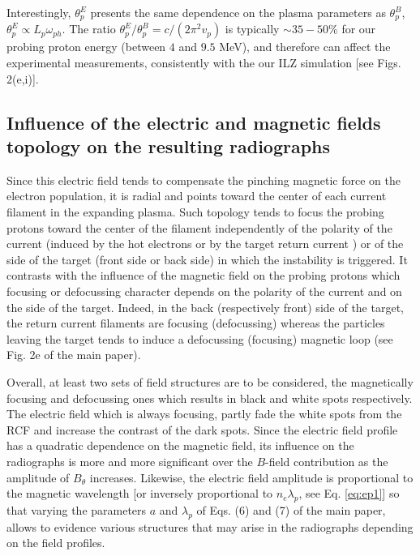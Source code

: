 \documentclass[aps,showpacs,superscriptaddress]{revtex4}
\begin{document}
Interestingly,  $\theta^E_p$ presents the same dependence on the plasma parameters as  $\theta^B_p$,  $\theta^E_p\propto L_p \omega_{ph}$.  The ratio $\theta^E_p/\theta^B_p =c/(2\pi^2v_p)$  is typically $\sim 35-50$\% for our  probing proton energy (between $4$ and $9.5$ MeV), and therefore can affect  the experimental measurements, consistently with the our ILZ simulation [see Figs. 2(e,i)].

\subsection{Influence of the electric and magnetic fields topology on the resulting radiographs}
Since this electric field tends to compensate the pinching magnetic force on the electron population, it is radial and points toward the center of each current filament in the expanding plasma. Such topology tends to focus the probing protons toward the center of the filament independently of the polarity of the current (induced by  the hot electrons or by the target return current ) or of the side of the target (front side or back side) in which the instability is triggered. 
It contrasts with the influence of the magnetic field on the probing protons which focusing or defocussing character depends on the polarity of the current and on the side of the target. Indeed,  in the back (respectively front) side of the target, the return current filaments are focusing (defocussing) whereas the   particles leaving the target  tends to induce a defocussing (focusing) magnetic loop (see Fig. 2e of the main paper).

Overall,   at least two sets of field structures  are to be considered, the magnetically focusing  and  defocussing ones which  results in black and white spots respectively. 
The electric field which is always focusing, partly  fade the white spots from the RCF and increase the contrast of the dark spots.  
Since the electric field profile has a quadratic dependence on the magnetic field, its influence on the radiographs is more and more significant over the $B$-field contribution as the amplitude of $B_\theta$  increases. Likewise,  the electric field amplitude is proportional to the magnetic wavelength [or inversely proportional to $n_e\lambda_p$, see Eq. \eqref{eq:ep1}] so that varying the 
parameters $a$ and $\lambda_p$ of Eqs. (6) and (7) of the main paper,
allows to evidence various structures that may arise in the radiographs depending on the field profiles.
\end{document}
